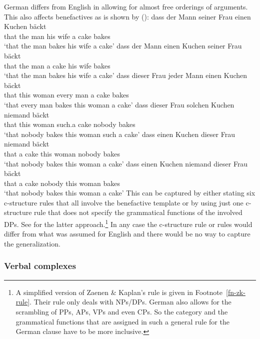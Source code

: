 German differs from English in allowing for almost free orderings of arguments. This also affects
benefactives as is shown by ():
\eal
\label{ex-scrambling-benefactive}
\ex 
\gll dass der Mann seiner Frau einen Kuchen bäckt\\
     that the man  his    wife a cake bakes\\
\glt `that the man bakes his wife a cake'
\ex 
\gll dass der Mann einen Kuchen seiner Frau bäckt\\
     that the man  a cake       his wife    bakes\\
\glt `that the man bakes his wife a cake'
\ex 
\gll dass dieser Frau jeder Mann einen Kuchen bäckt\\
     that this   woman every man a cake bakes\\
\glt `that every man bakes this woman a cake'
\ex 
\gll dass dieser Frau solchen Kuchen niemand bäckt\\
     that this woman  such.a  cake   nobody  bakes\\
\glt `that nobody bakes this woman such a cake'
\ex 
\gll dass einen Kuchen dieser Frau niemand bäckt\\
     that a cake this woman nobody bakes\\
\glt `that nobody bakes this woman a cake'
\ex 
\gll dass einen Kuchen niemand dieser Frau bäckt\\
     that a cake nobody this woman bakes\\
\glt `that nobody bakes this woman a cake'
\zl
This can be captured by either stating six c-structure rules that all involve the benefactive
template or by using just one c-structure rule that does not specify the grammatical functions of
the involved DPs. See  for the latter approach.\footnote{%
  A simplified version of Zaenen \& Kaplan's rule is given in Footnote~\ref{fn-zk-rule}. Their rule
  only deals with NPs/DPs. German also allows for the scrambling of PPs, APs, VPs and even CPs. So the
  category and the grammatical functions that are assigned in such a general rule for the German
  clause have to be more inclusive.
} In any case the c-structure rule or
rules would differ from what was assumed for English and there would be no way to capture the generalization.
 

\subsubsection{Verbal complexes}
\label{sec-verbal-complex}

